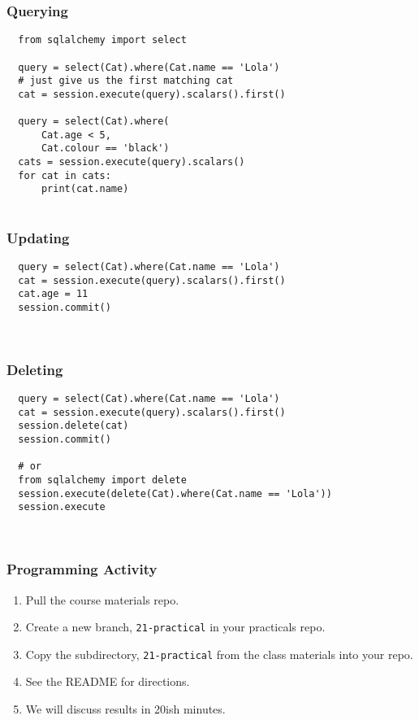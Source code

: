 \documentclass[10pt]{beamer}
\begin{document}
\begin{frame}[fragile]
  \frametitle{Querying}
  
  \begin{verbatim}
  from sqlalchemy import select
  
  query = select(Cat).where(Cat.name == 'Lola')
  # just give us the first matching cat
  cat = session.execute(query).scalars().first()  
  
  query = select(Cat).where(
      Cat.age < 5,
      Cat.colour == 'black')
  cats = session.execute(query).scalars()
  for cat in cats:
      print(cat.name)       
         
  \end{verbatim}
    
  \end{frame}

\begin{frame}[fragile]
  \frametitle{Updating}
  
  \begin{verbatim}
  query = select(Cat).where(Cat.name == 'Lola')
  cat = session.execute(query).scalars().first()  
  cat.age = 11
  session.commit() 
    
         
  \end{verbatim}
\end{frame}

\begin{frame}[fragile]
  \frametitle{Deleting}
  
  \begin{verbatim}
  query = select(Cat).where(Cat.name == 'Lola')
  cat = session.execute(query).scalars().first()  
  session.delete(cat)
  session.commit() 
  
  # or
  from sqlalchemy import delete
  session.execute(delete(Cat).where(Cat.name == 'Lola'))
  session.execute
    
         
  \end{verbatim}
\end{frame}


\begin{frame}
  \frametitle{Programming Activity}
  
  \begin{enumerate}
    \item Pull the course materials repo.
    \item Create a new branch, \texttt{21-practical} in your practicals repo.
    \item Copy the subdirectory, \texttt{21-practical} from the class materials into your repo.
    \item See the README for directions.
    \item We will discuss results in 20ish minutes.
  \end{enumerate}      
\end{frame}
  
\end{document}
